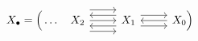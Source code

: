 \documentclass[crop,dvisvgm]{standalone}
\begin{document}
\[\begin {tikzcd}
    X_\bullet  = \Big (\ldots \quad 
    X_2
      \ar [r]
      \ar [r,shift left=4]
      \ar [r,shift right=4]
    & X_1
      \ar [r,shift left=2]
      \ar [r,shift right=2]
      \ar [l,shift right=2]
      \ar [l,shift left=2]
    & X_0\Big )
      \ar [l]
  \end {tikzcd}\]
\end{document}
